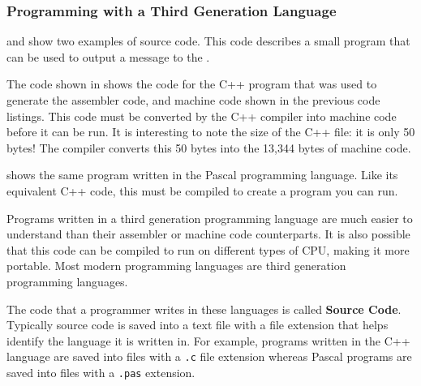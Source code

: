 \clearpage
\subsubsection{Programming with a Third Generation Language} %
\label{ssub:programming_with_a_third_generation_language}

 and  show two examples of source code. This code describes a small program that can be used to output a message to the .

\begin{multicols}{2}
  \columnbreak
\end{multicols}

The code shown in  shows the code for the C++ program that was used to generate the assembler code, and machine code shown in the previous code listings. This code must be converted by the C++ compiler into machine code before it can be run. It is interesting to note the size of the C++ file: it is only 50 bytes! The compiler converts this 50 bytes into the 13,344 bytes of machine code. 

 shows the same program written in the Pascal programming language. Like its equivalent C++ code, this must be compiled to create a program you can run.

Programs written in a third generation programming language are much easier to understand than their assembler or machine code counterparts. It is also possible that this code can be compiled to run on different types of CPU, making it more portable. Most modern programming languages are third generation programming languages.


The code that a programmer writes in these languages is called \textbf{Source Code}. Typically source code is saved into a text file with a file extension that helps identify the language it is written in. For example, programs written in the C++ language are saved into files with a {\tt .c} file extension whereas Pascal programs are saved into files with a {\tt .pas} extension.





